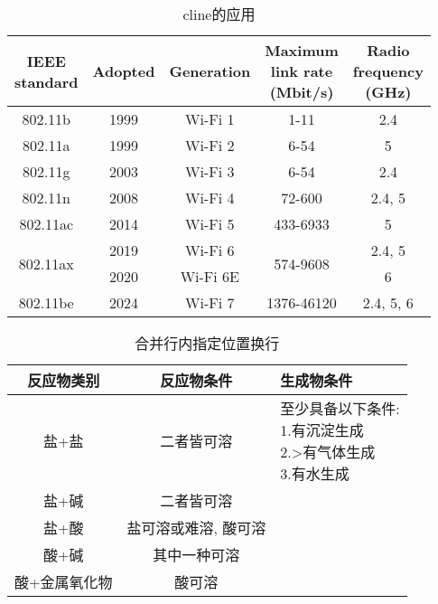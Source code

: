\documentclass[UTF8,fontset=ubuntu]{ctexart}
\begin{document}
\begin{table}
\centering
\begin{tabular}{|c|c|c|c|c|}
    \hline
    \makecell{IEEE\\ standard} & Adopted & Generation & \makecell{Maximum\\ link rate\\(Mbit/s)} & \makecell{Radio\\ frequency\\ (GHz)}\\
    \hline
    802.11b & 1999 & Wi-Fi 1 & 1-11 & 2.4\\
    \hline
    802.11a & 1999 & Wi-Fi 2 & 6-54 & 5\\
    \hline
    802.11g & 2003 & Wi-Fi 3 & 6-54 & 2.4\\
    \hline
    802.11n & 2008 & Wi-Fi 4 & 72-600 & 2.4, 5\\
    \hline
    802.11ac & 2014 & Wi-Fi 5 & 433-6933 & 5\\
    \hline
    \multirow{2}{*}{802.11ax} & 2019 & Wi-Fi 6 & \multirow{2}{*}{574-9608} & 2.4, 5\\
    \cline{2-3}
    \cline{5-5}
    & 2020 & Wi-Fi 6E & & 6\\
    \hline
    802.11be & \cellcolor[gray]{0.8}2024 & Wi-Fi 7 & 1376-46120 & 2.4, 5, 6\\
    \hline
\end{tabular}
\caption{\\cline的应用}
\end{table}

\begin{table}[H]
\begin{tabular}{|c|c|l|}
\hline
    反应物类别 & 反应物条件 & 生成物条件\\
\hline
    盐+盐 & 二者皆可溶 & \multirowcell{5}{至少具备以下条件:\\ 1.有沉淀生成\\ 2.>有气体生成\\ 3.有水生成}\\
    \cline{1-2}
    盐+碱 & 二者皆可溶 &\\
    \cline{1-2}
    盐+酸 & 盐可溶或难溶, 酸可溶 &\\
    \cline{1-2}
    酸+碱 & 其中一种可溶 &\\
    \cline{1-2}
    酸+金属氧化物 & 酸可溶 &\\
\hline
\end{tabular}
\caption{合并行内指定位置换行}
\end{table}
\end{document}
